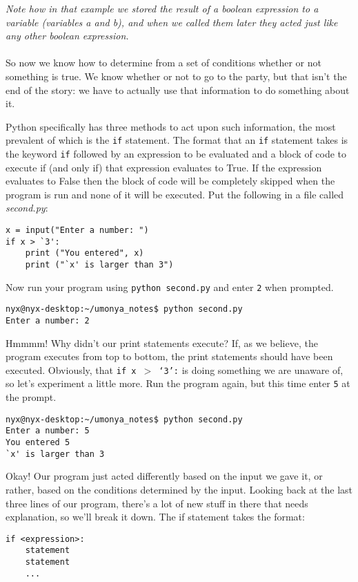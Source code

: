 \textit{Note how in that example we stored the result of a boolean expression to a variable (variables a and b), and when we called them later they acted just like any other boolean expression.}\\
\\ So now we know how to determine from a set of conditions whether or not something is true. We know whether or not to go to the party, but that isn't the end of the story: we have to actually use that information to do something about it.

Python specifically has three methods to act upon such information, the most prevalent of which is the \texttt{if} statement. The format that an \texttt{if} statement                 takes is the keyword \texttt{if} followed by an expression to be evaluated and a block of code to execute if (and only if) that expression evaluates to True. If the expression evaluates to False                 then the block of code will be completely skipped when the program is run and none of it will be executed.                 Put the   following in a file called \textit{second.py}:
\begin{lstlisting}
x = input("Enter a number: ")
if x > `3':
    print ("You entered", x)
    print ("`x' is larger than 3")
\end{lstlisting}

Now run your program using 
\texttt{python second.py} and enter   \texttt{2} when prompted.
\begin{lstlisting}
nyx@nyx-desktop:~/umonya_notes$ python second.py 
Enter a number: 2
\end{lstlisting}

Hmmmm! Why didn't our print statements execute? If, as we believe,   the program executes from top to bottom, the print statements should   have been executed. Obviously, that 
\texttt{if x $>$ `3':} is   doing something we are unaware of, so let's experiment a little more.   Run the program again, but this time enter \texttt{5} at the prompt.
\begin{lstlisting}
nyx@nyx-desktop:~/umonya_notes$ python second.py 
Enter a number: 5
You entered 5
`x' is larger than 3
\end{lstlisting}

Okay! Our program just acted differently based on the input we gave   it, or rather, based on the conditions determined by the input. Looking   back at the last three lines of our program, there's a lot of new stuff   in there that needs explanation, so we'll break it down. The if   statement takes the format:
\begin{lstlisting}
if <expression>:
    statement
    statement
    ...
\end{lstlisting}

